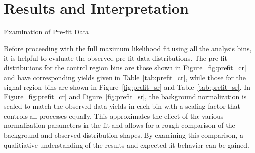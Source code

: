 \chapter{Results and Interpretation}

\begin{section}{Examination of Pre-fit Data}
\label{sec:prefit_data}

Before proceeding with the full maximum likelihood fit using all the analysis bins, it is helpful to evaluate the observed pre-fit data distributions.
The pre-fit \Nb distributions for the control region bins are those shown in Figure~\ref{fig:prefit_cr} and have corresponding yields given in Table~\ref{tab:prefit_cr}, while those for the signal region bins are shown in Figure~\ref{fig:prefit_sr} and Table~\ref{tab:prefit_sr}.
In Figure~\ref{fig:prefit_cr} and Figure~\ref{fig:prefit_sr}, the background normalization is scaled to match the observed data yields in each bin with a scaling factor that controls all processes equally.
This approximates the effect of the various normalization parameters in the fit and allows for a rough comparison of the background and observed \Nb distribution shapes.
By examining this comparison, a qualitiative understanding of the results and expected fit behavior can be gained.


\end{section}
